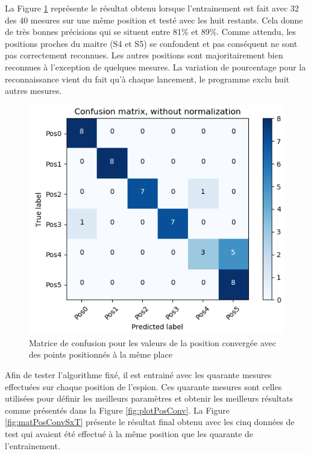La Figure \ref{fig:matPosConvSx} représente le résultat obtenu lorsque l'entrainement est fait avec 32 des 40 mesures sur une même position et testé avec les huit restants. Cela donne de très bonnes précisions qui se situent entre 81\% et 89\%. Comme attendu, les positions proches du maitre (S4 et S5) se confondent et pas conséquent ne sont pas correctement reconnues. Les autres positions sont majoritairement bien reconnues à l'exception de quelques mesures. La variation de pourcentage pour la reconnaissance vient du fait qu'à chaque lancement, le programme exclu huit autres mesures.

\begin{figure}[htp]
 \begin{center}
  \includegraphics[scale=0.5]{figures/mat_pos_conv_Sx_2.PNG}
  \caption{Matrice de confusion pour les valeurs de la position convergée avec des points positionnés à la même place}
  \label{fig:matPosConvSx} %
 \end{center}
\end{figure}

Afin de tester l'algorithme fixé, il est entrainé avec les quarante mesures effectuées sur chaque position de l'espion. Ces quarante mesures sont celles utilisées pour définir les meilleurs paramètres et obtenir les meilleurs résultats comme présentés dans la Figure \ref{fig:plotPosConv}. La Figure \ref{fig:matPosConvSxT} présente le résultat final obtenu avec les cinq données de test qui avaient été effectué à la même position que les quarante de l'entrainement. 

